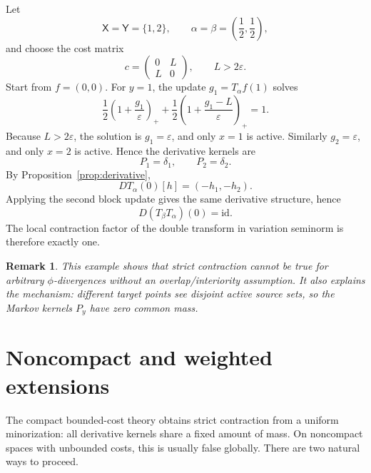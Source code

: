 \documentclass[11pt]{article}
\newtheorem{remark}[theorem]{Remark}
\newcommand{\X}{\mathsf{X}}
\newcommand{\Y}{\mathsf{Y}}
\newcommand{\eps}{\varepsilon}
\newcommand{\id}{\mathrm{id}}
\begin{document}
Let
\begin{equation*}
  \X=\Y=\{1,2\},
  \qquad
  \alpha=\beta=\left(\frac12,\frac12\right),
\end{equation*}
and choose the cost matrix
\begin{equation}\label{eq:chicost}
  c=
  \begin{pmatrix}
  0 & L\\
  L & 0
  \end{pmatrix},
  \qquad L>2\eps.
\end{equation}
Start from $f=(0,0)$.  For $y=1$, the update $g_1=T_\alpha f(1)$ solves
\begin{equation*}
  \frac12\left(1+\frac{g_1}{\eps}\right)_+
  +
  \frac12\left(1+\frac{g_1-L}{\eps}\right)_+
  =1.
\end{equation*}
Because $L>2\eps$, the solution is $g_1=\eps$, and only $x=1$ is active.
Similarly $g_2=\eps$, and only $x=2$ is active.  Hence the derivative kernels
are
\begin{equation*}
  P_1=\delta_1,
  \qquad
  P_2=\delta_2.
\end{equation*}
By Proposition~\ref{prop:derivative},
\begin{equation*}
  DT_\alpha(0)[h]=(-h_1,-h_2).
\end{equation*}
Applying the second block update gives the same derivative structure, hence
\begin{equation*}
  D(T_\beta T_\alpha)(0)=\id.
\end{equation*}
The local contraction factor of the double transform in variation seminorm is
therefore exactly one.

\begin{remark}
This example shows that strict contraction cannot be true for arbitrary
$\phi$-divergences without an overlap/interiority assumption.  It also explains
the mechanism: different target points see disjoint active source sets, so the
Markov kernels $P_y$ have zero common mass.
\end{remark}

\section{Noncompact and weighted extensions}\label{sec:noncompact}

The compact bounded-cost theory obtains strict contraction from a uniform
minorization: all derivative kernels share a fixed amount of mass.  On
noncompact spaces with unbounded costs, this is usually false globally.  There
are two natural ways to proceed.
\end{document}
